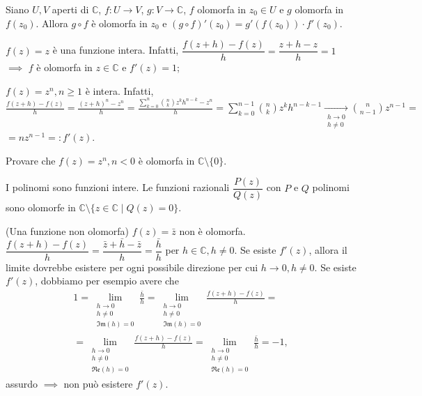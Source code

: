 \begin{prop}
  Siano $U, V$ aperti di $\mathbb{C}$, $f:U \longrightarrow V$, $g:V \longrightarrow \mathbb{C}$, $f$ olomorfa in $z_0 \in U$ e $g$ olomorfa in $f(z_0)$. Allora $g \circ f$ è olomorfa in $z_0$ e $(g \circ f)'(z_0)=g'(f(z_0))\cdot f'(z_0)$.
\end{prop}

\begin{ex}
  \begin{nlist}
    \item $f(z)=z$ è una funzione intera. Infatti, $\dfrac{f(z+h)-f(z)}{h}=\dfrac{z+h-z}{h}=1$ $\implies$ $f$ è olomorfa in $z \in \mathbb{C}$ e $f'(z)=1$;
    \item $f(z)=z^n, n \ge 1$ è intera.
    Infatti, $\displaystyle \frac{f(z+h)-f(z)}{h}=\frac{(z+h)^n-z^n}{h}=\frac{\sum_{k=0}^n \binom{n}{k}z^kh^{n-k}-z^n}{h}=\sum_{k=0}^{n-1} \binom{n}{k}z^kh^{n-k-1} \xrightarrow[\substack{h \longrightarrow 0 \\ h\not=0}]{} \binom{n}{n-1} z^{n-1}=$\\
    $=nz^{n-1}=:f'(z)$.
  \end{nlist}
\end{ex}

\begin{exc}
  Provare che $f(z)=z^n, n<0$ è olomorfa in $\mathbb{C}\setminus\{0\}$.
\end{exc}

\begin{oss}
  I polinomi sono funzioni intere. Le funzioni razionali $\dfrac{P(z)}{Q(z)}$ con $P$ e $Q$ polinomi sono olomorfe in $\mathbb{C} \setminus \{z \in \mathbb{C} \mid Q(z)=0\}$.
\end{oss}

\begin{ex}
  (Una funzione non olomorfa) $f(z)=\bar{z}$ non è olomorfa. $\dfrac{f(z+h)-f(z)}{h}=\dfrac{\bar{z}+\bar{h}-\bar{z}}{h}=\dfrac{\bar{h}}{h}$ per $h \in \mathbb{C}, h \not=0$. Se esiste $f'(z)$, allora il limite dovrebbe esistere per ogni possibile direzione per cui $h \longrightarrow 0, h\not=0$. Se esiste $f'(z)$, dobbiamo per esempio avere che
  \begin{align*}
    1=\lim_{\substack{h \longrightarrow 0 \\ h\not=0 \\ \mathfrak{Im}(h)=0}} \frac{\bar{h}}{h}=\lim_{\substack{h \longrightarrow 0 \\ h\not=0 \\ \mathfrak{Im}(h)=0}} \frac{f(z+h)-f(z)}{h}=\\
    =\lim_{\substack{h \longrightarrow 0 \\ h\not=0 \\ \mathfrak{Re}(h)=0}} \frac{f(z+h)-f(z)}{h}=\lim_{\substack{h \longrightarrow 0 \\ h\not=0 \\ \mathfrak{Re}(h)=0}} \frac{\bar{h}}{h}=-1,
  \end{align*}
  assurdo $\implies$ non può esistere $f'(z)$.
\end{ex}

